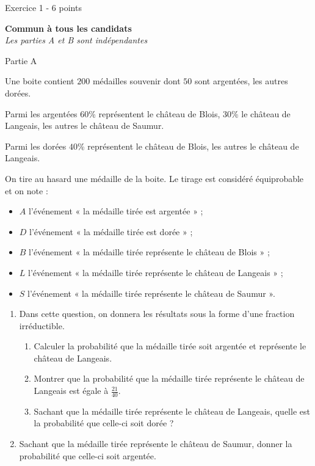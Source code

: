 
%
\begin{h2}Exercice 1 - 6 points\end{h2}
\textbf{Commun à tous les candidats}
\\
\textit{Les parties A et B sont indépendantes}
\par
\begin{h3}Partie A\end{h3}
Une boite contient $200$ médailles souvenir dont $50$ sont argentées, les autres dorées.
\par
Parmi les argentées $60$\% représentent le château de Blois, $30$\% le château de Langeais, les autres le château de Saumur.
\par
Parmi les dorées $40$\% représentent le château de Blois, les autres le château de Langeais.
\par
On tire au hasard une médaille de la boite. Le tirage est considéré équiprobable et on note :
\begin{itemize}
     \item
     $A$ l'événement « la médaille tirée est argentée » ;
     \item
     $D$ l'événement « la médaille tirée est dorée » ;
     \item
     $B$ l'événement « la médaille tirée représente le château de Blois » ;
     \item
     $L$ l'événement « la médaille tirée représente le château de Langeais » ;
     \item
$S$ l'événement « la médaille tirée représente le château de Saumur ».\end{itemize}
\begin{enumerate}
     \item
     Dans cette question, on donnera les résultats sous la forme d'une fraction irréductible.
     \begin{enumerate}[label=\alph*.]
          \item
          Calculer la probabilité que la médaille tirée soit argentée et représente le château de Langeais.
          \item
          Montrer que la probabilité que la médaille tirée représente le château de Langeais est égale à $\frac{21}{40}$.
          \item
          Sachant que la médaille tirée représente le château de Langeais, quelle est la probabilité que celle-ci soit dorée ?
     \end{enumerate}
     \item
     Sachant que la médaille tirée représente le château de Saumur, donner la probabilité que celle-ci soit argentée.
\end{enumerate}
